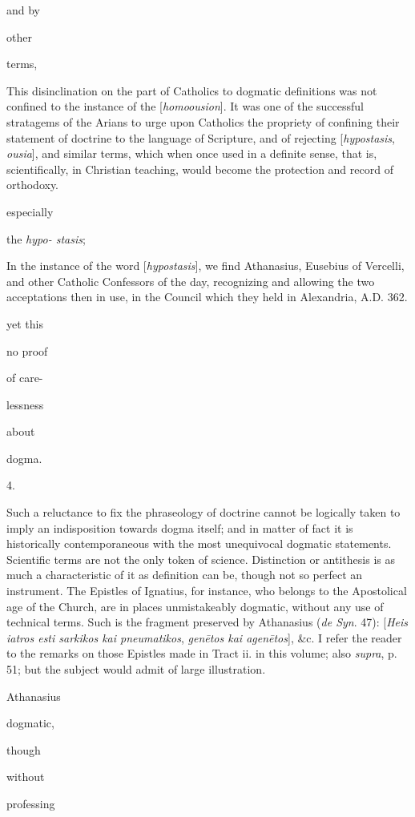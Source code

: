 and by

other

terms,

This disinclination on the part of
Catholics to dogmatic definitions was not confined to the
instance of the [\emph{homoousion}]. It was one of the
successful stratagems of the Arians to urge upon Catholics the
propriety of confining their statement of doctrine to the
language of Scripture, and of rejecting [\emph{hypostasis}, \emph{ousia}],
and similar terms, which when once used in a definite sense,
that is, scientifically, in Christian teaching, would become
the protection and record of orthodoxy.

especially

the \emph{hypo- stasis};

In the instance of the word [\emph{hypostasis}],
we find Athanasius, Eusebius of Vercelli, and other Catholic
Confessors of the day, recognizing and allowing the two
acceptations then in use, in the Council which they held in
Alexandria, A.D. 362. 

yet this

no proof

of care-

lessness

about

dogma.

4.

Such a reluctance to fix the phraseology
of doctrine cannot be logically taken to imply an
indisposition towards dogma itself; and in matter of fact it
is historically contemporaneous with the most unequivocal
dogmatic statements. Scientific terms are not the only token
of science. Distinction or antithesis is as much a
characteristic of it as definition can be, though not so
perfect an instrument. The Epistles of Ignatius, for instance,
who belongs to the Apostolical age of the Church, are in
places unmistakeably dogmatic, without any use of technical
terms. Such is the fragment preserved by Athanasius (\emph{de Syn}.
47): [\emph{Heis iatros esti sarkikos kai pneumatikos}, \emph{gen\={e}tos
kai agen\={e}tos}], \&c. I refer the reader to the
remarks on those Epistles made in Tract
ii. in this volume;
also \emph{supra}, p. 51; but the subject would admit of large
illustration.

Athanasius

dogmatic,

though

without

professing

